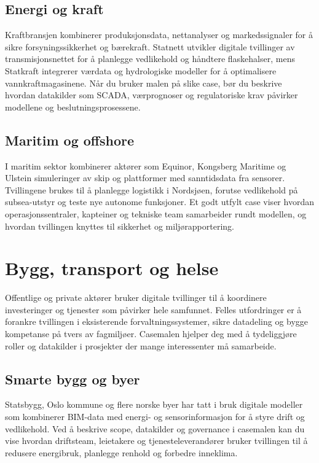 \subsection*{Energi og kraft}
Kraftbransjen kombinerer produksjonsdata, nettanalyser og markedssignaler for å sikre forsyningssikkerhet og bærekraft. Statnett utvikler digitale tvillinger av transmisjonsnettet for å planlegge vedlikehold og håndtere flaskehalser, mens Statkraft integrerer værdata og hydrologiske modeller for å optimalisere vannkraftmagasinene. Når du bruker malen på slike case, bør du beskrive hvordan datakilder som SCADA, værprognoser og regulatoriske krav påvirker modellene og beslutningsprosessene.

\subsection*{Maritim og offshore}
I maritim sektor kombinerer aktører som Equinor, Kongsberg Maritime og Ulstein simuleringer av skip og plattformer med sanntidsdata fra sensorer. Tvillingene brukes til å planlegge logistikk i Nordsjøen, forutse vedlikehold på subsea-utstyr og teste nye autonome funksjoner. Et godt utfylt case viser hvordan operasjonssentraler, kapteiner og tekniske team samarbeider rundt modellen, og hvordan tvillingen knyttes til sikkerhet og miljørapportering.

\section{Bygg, transport og helse}
Offentlige og private aktører bruker digitale tvillinger til å koordinere investeringer og tjenester som påvirker hele samfunnet. Felles utfordringer er å forankre tvillingen i eksisterende forvaltningssystemer, sikre datadeling og bygge kompetanse på tvers av fagmiljøer. Casemalen hjelper deg med å tydeliggjøre roller og datakilder i prosjekter der mange interessenter må samarbeide.

\subsection*{Smarte bygg og byer}
Statsbygg, Oslo kommune og flere norske byer har tatt i bruk digitale modeller som kombinerer BIM-data med energi- og sensorinformasjon for å styre drift og vedlikehold. Ved å beskrive scope, datakilder og governance i casemalen kan du vise hvordan driftsteam, leietakere og tjenesteleverandører bruker tvillingen til å redusere energibruk, planlegge renhold og forbedre inneklima.

